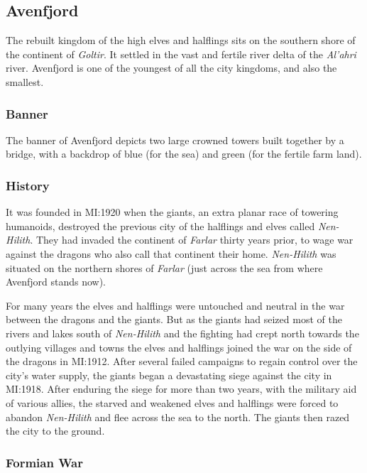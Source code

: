 \subsection{Avenfjord}
\label{sec:Avenfjord}

The rebuilt kingdom of the high elves and halflings sits on the southern shore
of the continent of \emph{Goltir}. It settled in the vast and fertile river
delta of the \emph{Al'ahri} river. Avenfjord is one of the youngest of all the
city kingdoms, and also the smallest.

\subsubsection*{Banner}

The banner of Avenfjord depicts two large crowned towers built together by
a bridge, with a backdrop of blue (for the sea) and green (for the fertile
farm land).

\subsubsection*{History}

It was founded in MI:1920 when the giants, an extra planar race of towering
humanoids, destroyed the previous city of the halflings and elves called
\emph{Nen-Hilith}. They had invaded the continent of \emph{Farlar} thirty
years prior, to wage war against the dragons who also call that continent
their home. \emph{Nen-Hilith} was situated on the northern shores of
\emph{Farlar} (just across the sea from where Avenfjord stands now).

For many years the elves and halflings were untouched and neutral in the
war between the dragons and the giants. But as the giants had seized most of
the rivers and lakes south of \emph{Nen-Hilith} and the fighting had crept
north towards the outlying villages and towns the elves and halflings joined
the war on the side of the dragons in MI:1912. After several failed campaigns
to regain control over the city's water supply, the giants began a devastating
siege against the city in MI:1918. After enduring the siege for more than two
years, with the military aid of various allies, the starved and weakened elves
and halflings were forced to abandon \emph{Nen-Hilith} and flee across the sea
to the north. The giants then razed the city to the ground.

\subsubsection*{Formian War}

